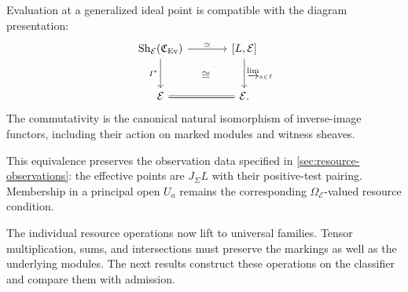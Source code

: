 \documentclass[11pt,a4paper]{article}
\numberwithin{algorithm}{section}
\numberwithin{equation}{section}
\theoremstyle{definition}
\theoremstyle{remark}
\theoremstyle{plain}
\newcommand{\E}{\mathcal E}
\newcommand{\Truth}{\Omega_{\E}}
\newcommand{\J}{J_{\Sigma}}
\newcommand{\Ev}{{\operatorname{Ev}}}
\newcommand{\Cplx}{\mathfrak C_{\Ev}}
\newcommand{\Sh}{\operatorname{Sh}}
\theoremstyle{definition}
\theoremstyle{plain}
\begin{document}
Evaluation at a generalized ideal point is compatible with the
diagram presentation:
\[
\begin{tikzcd}[column sep=large,row sep=large]
 \Sh_\E(\Cplx) \arrow[dr,phantom,"\cong" description] \arrow[r,"{\simeq}"] \arrow[d,"{I^*}"']
   & {[L,\E]} \arrow[d,"{{\varinjlim_{a\in I}}}"]\\
 \E \arrow[r,equal] & \E .
\end{tikzcd}
\]
The commutativity is the canonical natural isomorphism of inverse-image
functors, including their action on marked modules and witness sheaves.


This equivalence preserves the observation data specified in
\cref{sec:resource-observations}: the effective points are $\J L$
with their positive-test pairing. Membership in a principal open
$U_a$ remains the corresponding $\Truth$-valued resource condition.

The individual resource operations now lift to universal families.
Tensor multiplication, sums, and intersections must preserve the
markings as well as the underlying modules. The next results construct
these operations on the classifier and compare them with admission.
\end{document}
